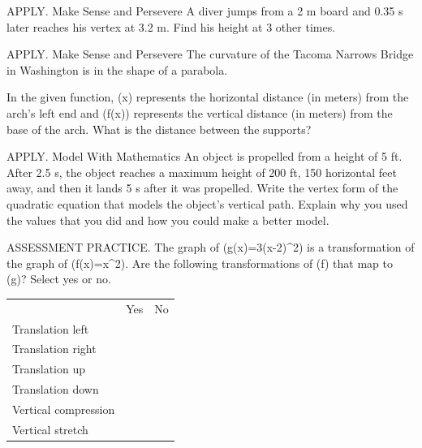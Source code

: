 \documentclass{article}
\newenvironment{practice}[2]{}{}        %
\newcommand{\answer}[1]{}               %
\newcommand{\placeholder}[2]{}          %
\newcommand{\te}[1]{}                   %
\begin{document}
\begin{practice}{33}{2}
APPLY. Make Sense and Persevere A diver jumps from a 2 m board and 0.35 s later reaches his vertex at 3.2 m. Find his height at 3 other times.
\answer{Answers will vary. Sample: (0.7 s, 2 m), (0.9 s, 0.24 m), (0.2 s, 2.98 m).}
\end{practice}
\begin{practice}{34}{2}
APPLY. Make Sense and Persevere The curvature of the Tacoma Narrows Bridge in Washington is in the shape of a parabola.
\placeholder{photo}{Tacoma Narrows suspension bridge over blue water, green towers and white highlighted deck/arch. Callout pointing to arch: f(x)=-0.016(x-52.5)^2+45.}
In the given function, (x) represents the horizontal distance (in meters) from the arch's left end and (f(x)) represents the vertical distance (in meters) from the base of the arch. What is the distance between the supports?
\answer{about 106 m}
\end{practice}
\begin{practice}{35}{3}
APPLY. Model With Mathematics An object is propelled from a height of 5 ft. After 2.5 s, the object reaches a maximum height of 200 ft, 150 horizontal feet away, and then it lands 5 s after it was propelled. Write the vertex form of the quadratic equation that models the object's vertical path. Explain why you used the values that you did and how you could make a better model.
\answer{(y\approx -31.2(x-2.5)^2+200); Answers will vary. Sample: Because we are interested in the vertical path, we need to ignore the horizontal distance. We could make a better model by recording more data points.}
\te{Printed initial height 5 ft and landing time 5 s are not both satisfied by the printed model; the model gives height 5 ft at 5 s.}
\end{practice}
\begin{practice}{36}{1}
ASSESSMENT PRACTICE. The graph of (g(x)=3(x-2)^2) is a transformation of the graph of (f(x)=x^2). Are the following transformations of (f) that map to (g)? Select yes or no.
\begin{tabular}{lll}
 & Yes & No \\
Translation left & & \\
Translation right & & \\
Translation up & & \\
Translation down & & \\
Vertical compression & & \\
Vertical stretch & & \\
\end{tabular}
\answer{Translation left: No; Translation right: Yes; Translation up: No; Translation down: No; Vertical compression: No; Vertical stretch: Yes.}
\end{practice}
\end{document}
